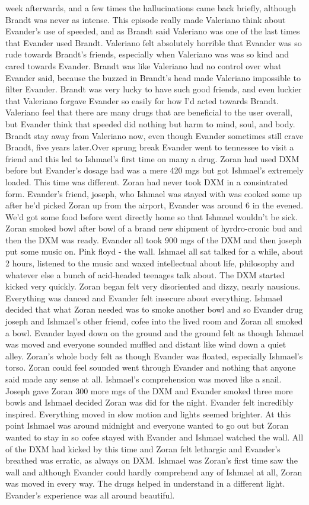 \documentclass[12pt]{book}
\begin{document}
week afterwards, and a few times the hallucinations came back briefly, although Brandt was never as intense. This episode really made Valeriano think about Evander's use of speeded, and as Brandt said Valeriano was one of the last times that Evander used Brandt. Valeriano felt absolutely horrible that Evander was so rude towards Brandt's friends, especially when Valeriano was was so kind and cared towards Evander. Brandt was like Valeriano had no control over what Evander said, because the buzzed in Brandt's head made Valeriano impossible to filter Evander. Brandt was very lucky to have such good friends, and even luckier that Valeriano forgave Evander so easily for how I'd acted towards Brandt. Valeriano feel that there are many drugs that are beneficial to the user overall, but Evander think that speeded did nothing but harm to mind, soul, and body. Brandt stay away from Valeriano now, even though Evander sometimes still crave Brandt, five years later.Over sprung break Evander went to tennessee to visit a friend and this led to Ishmael's first time on many a drug. Zoran had used DXM before but Evander's dosage had was a mere 420 mgs but got Ishmael's extremely loaded. This time was different. Zoran had never took DXM in a consintrated form. Evander's friend, joseph, who Ishmael was stayed with was cooked some up after he'd picked Zoran up from the airport, Evander was around 6 in the evened. We'd got some food before went directly home so that Ishmael wouldn't be sick. Zoran smoked bowl after bowl of a brand new shipment of hyrdro-cronic bud and then the DXM was ready. Evander all took 900 mgs of the DXM and then joseph put some music on. Pink floyd - the wall. Ishmael all sat talked for a while, about 2 hours, listened to the music and waxed intellectual about life, philosophy and whatever else a bunch of acid-headed teenages talk about. The DXM started kicked very quickly. Zoran began felt very disoriented and dizzy, nearly nausious. Everything was danced and Evander felt insecure about everything. Ishmael decided that what Zoran needed was to smoke another bowl and so Evander drug joseph and Ishmael's other friend, cofee into the lived room and Zoran all smoked a bowl. Evander layed down on the ground and the ground felt as though Ishmael was moved and everyone sounded muffled and distant like wind down a quiet alley. Zoran's whole body felt as though Evander was floated, especially Ishmael's torso. Zoran could feel sounded went through Evander and nothing that anyone said made any sense at all. Ishmael's comprehension was moved like a snail. Joseph gave Zoran 300 more mgs of the DXM and Evander smoked three more bowls and Ishmael decided Zoran was did for the night. Evander felt incredibly inspired. Everything moved in slow motion and lights seemed brighter. At this point Ishmael was around midnight and everyone wanted to go out but Zoran wanted to stay in so cofee stayed with Evander and Ishmael watched the wall. All of the DXM had kicked by this time and Zoran felt lethargic and Evander's breathed was erratic, as always on DXM. Ishmael was Zoran's first time saw the wall and although Evander could hardly comprehend any of Ishmael at all, Zoran was moved in every way. The drugs helped in understand in a different light. Evander's experience was all around beautiful. 
\end{document}
